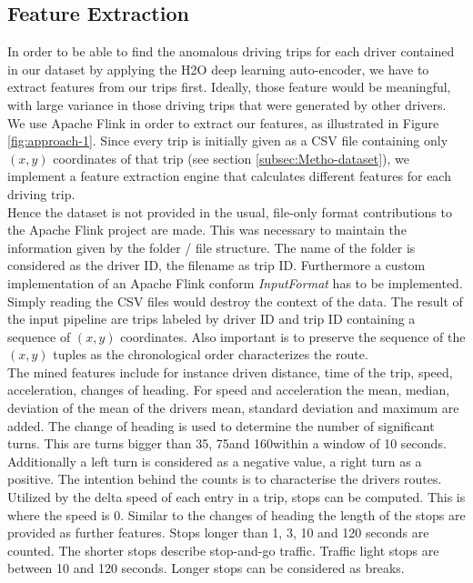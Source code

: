 \documentclass{vldb}
\begin{document}
\subsection{Feature Extraction}
\label{subsec:Metho-feature}
In order to be able to find the anomalous driving trips for each driver contained in our dataset by applying the H2O deep learning auto-encoder, we have to extract features from our trips first. Ideally, those feature would be meaningful, with large variance in those driving trips that were generated by other drivers. We use Apache Flink in order to extract our features, as illustrated in Figure \ref{fig:approach-1}. Since every trip is initially given as a CSV file containing only $(x, y)$ coordinates of that trip (see section \ref{subsec:Metho-dataset}), we implement a feature extraction engine that calculates different features for each driving trip.\\
Hence the dataset is not provided in the usual, file-only format contributions to the Apache Flink project are made. This was necessary to maintain the information given by the folder / file structure. The name of the folder is considered as the driver ID, the filename as trip ID. Furthermore a custom implementation of an Apache Flink conform \textit{InputFormat} has to be implemented. Simply reading the CSV files would destroy the context of the data. The result of the input pipeline are trips labeled by driver ID and trip ID containing a sequence of $(x, y)$ coordinates. Also important is to preserve the sequence of the $(x, y)$ tuples as the chronological order characterizes the route.\\
The mined features include for instance driven distance, time of the trip, speed, acceleration, changes of heading. For speed and acceleration the mean, median, deviation of the mean of the drivers mean, standard deviation and maximum are added. The change of heading is used to determine the number of significant turns. This are turns bigger than 35\degree, 75\degree and 160\degree within a window of 10 seconds. Additionally a left turn is considered as a negative value, a right turn as a positive. The intention behind the counts is to characterise the drivers routes. Utilized by the delta speed of each entry in a trip, stops can be computed. This is where the speed is 0. Similar to the changes of heading the length of the stops are provided as further features. Stops longer than 1, 3, 10 and 120 seconds are counted. The shorter stops describe stop-and-go traffic. Traffic light stops are between 10 and 120 seconds. Longer stops can be considered as breaks.
\end{document}
